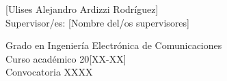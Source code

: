 \begin{center}
   \vspace{1.2cm}

  [Ulises Alejandro Ardizzi Rodríguez]\\

   \vspace{1.2cm}
  Supervisor/es: [Nombre del/os supervisores]
  
  \vspace{2.5cm}
  Grado en Ingeniería Electrónica de Comunicaciones\\
  Curso académico 20[XX-XX]\\
  Convocatoria XXXX\\



\end{center}




